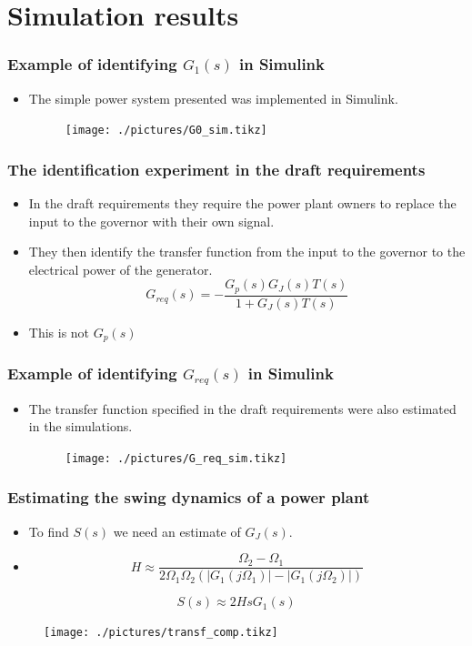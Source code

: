 \section{Simulation results}
\begin{frame}
		\frametitle{Example of identifying $G_1(s)$ in Simulink }
	\begin{itemize}
			\item The simple power system presented was implemented in Simulink.
			\begin{figure}
					\texttt{[image: ./pictures/G0\_sim.tikz]}
			\end{figure}
	\end{itemize}
\end{frame}
\begin{frame}
	\frametitle{The identification experiment in the draft requirements}
	\begin{itemize}[<+->]
			\item In the draft requirements they require the power plant owners to replace the input to the governor with their own signal.
			\item They then identify the transfer function from the input to the governor to the electrical power of the generator.
			\begin{equation}\label{eq:G_req}
				G_{req}(s) = -\frac{G_p(s)G_J(s)T(s)}{1+G_J(s)T(s)}
			\end{equation}
			\item This is not $G_p(s)$
	\end{itemize}
\end{frame}
\begin{frame}
		\frametitle{Example of identifying $G_{req}(s)$ in Simulink }
	\begin{itemize}
			\item The transfer function specified in the draft requirements were also estimated in the simulations.
			\begin{figure}
					\texttt{[image: ./pictures/G\_req\_sim.tikz]}
			\end{figure}
	\end{itemize}
\end{frame}
\begin{frame}
	\frametitle{Estimating the swing dynamics of a power plant}
	\begin{itemize}[<+->]
		\item To find $S(s)$ we need an estimate of $G_J(s)$.
		\item 
			\begin{equation}
				H\approx \frac{\Omega_2 - \Omega_1}{2\Omega_1\Omega_2(|G_1(j\Omega_1)|-|G_1(j\Omega_2)|)}
			\end{equation}
	\end{itemize}
	\begin{equation}\label{eq:S_ident}
		S(s) \approx 2HsG_1(s)
	\end{equation}
	\begin{figure}
		\texttt{[image: ./pictures/transf\_comp.tikz]}
	\end{figure}
\end{frame}
